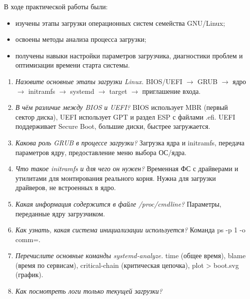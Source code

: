 

В ходе практической работы были:
\begin{itemize}
	\item изучены этапы загрузки операционных систем семейства GNU/Linux;
	\item освоены методы анализа процесса загрузки;
	\item получены навыки настройки параметров загрузчика, диагностики проблем и оптимизации времени старта системы.
\end{itemize}


\begin{enumerate}
	\item \textit{Назовите основные этапы загрузки Linux.}\newline 
	BIOS/UEFI $\rightarrow$ GRUB $\rightarrow$ ядро $\rightarrow$ initramfs $\rightarrow$ systemd $\rightarrow$ target $\rightarrow$ приглашение входа.
	\item \textit{В чём различие между BIOS и UEFI?}\newline 
	BIOS использует MBR (первый сектор диска), UEFI использует GPT и раздел ESP с файлами .efi. UEFI поддерживает Secure Boot, большие диски, быстрее загружается.
	\item \textit{Какова роль GRUB в процессе загрузки?}\newline 
	Загрузка ядра и initramfs, передача параметров ядру, предоставление меню выбора ОС/ядра.
	\item \textit{Что такое initramfs и для чего он нужен?}\newline 
	Временная ФС с драйверами и утилитами для монтирования реального корня. Нужна для загрузки драйверов, не встроенных в ядро.
	\item \textit{Какая информация содержится в файле /proc/cmdline?}\newline 
	Параметры, переданные ядру загрузчиком.
	\item \textit{Как узнать, какая система инициализации используется?}\newline 
	Команда ps -p 1 -o comm=.
	\item \textit{Перечислите основные команды systemd-analyze.}\newline 
	time (общее время), blame (время по сервисам), critical-chain (критическая цепочка), plot > boot.svg (график).
	\item \textit{Как посмотреть логи только текущей загрузки?}\newline 

\end{enumerate}

